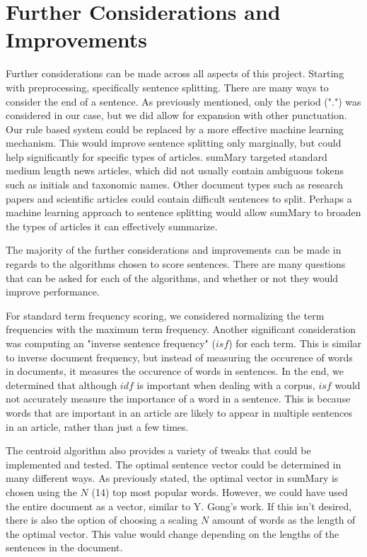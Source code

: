 \documentclass[11pt,a4paper]{article}
\begin{document}
\section{Further Considerations and Improvements}
Further considerations can be made across all aspects of this project. Starting with preprocessing, specifically sentence splitting. There are many ways to consider the end of a sentence. As previously mentioned, only the period (".") was considered in our case, but we did allow for expansion with other punctuation. Our rule based system could be replaced by a more effective machine learning mechanism. This would improve sentence splitting only marginally, but could help significantly for specific types of articles. sumMary targeted standard medium length news articles, which did not usually contain ambiguous tokens such as initials and taxonomic names. Other document types such as research papers and scientific articles could contain difficult sentences to split. Perhaps a machine learning approach to sentence splitting would allow sumMary to broaden the types of articles it can effectively summarize.

The majority of the further considerations and improvements can be made in regards to the algorithms chosen to score sentences. There are many questions that can be asked for each of the algorithms, and whether or not they would improve performance.

For standard term frequency scoring, we considered normalizing the term frequencies with the maximum term frequency. Another significant consideration was computing an "inverse sentence frequency" ($isf$) for each term. This is similar to inverse document frequency, but instead of measuring the occurence of words in documents, it measures the occurence of words in sentences. In the end, we determined that although $idf$ is important when dealing with a corpus, $isf$ would not accurately measure the importance of a word in a sentence. This is because words that are important in an article are likely to appear in multiple sentences in an article, rather than just a few times.

The centroid algorithm also provides a variety of tweaks that could be implemented and tested. The optimal sentence vector could be determined in many different ways. As previously stated, the optimal vector in sumMary is chosen using the $N$ (14) top most popular words. However, we could have used the entire document as a vector, similar to Y. Gong's work. If this isn't desired, there is also the option of choosing a scaling $N$ amount of words as the length of the optimal vector. This value would change depending on the lengths of the sentences in the document.
\end{document}
